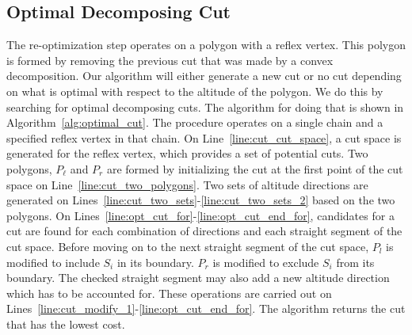 \documentclass[../main.tex]{subfiles}
\begin{document}
\subsection{Optimal Decomposing Cut}
\label{sec:alt_cut_decomposition}
The re-optimization step operates on a polygon with a reflex vertex. This polygon is formed by removing the previous cut that was made by a convex decomposition. Our algorithm will either generate a new cut or no cut depending on what is optimal with respect to the altitude of the polygon. We do this by searching for optimal decomposing cuts. The algorithm for doing that is shown in Algorithm~\ref{alg:optimal_cut}. The procedure operates on a single chain and a specified reflex vertex in that chain. On Line~\ref{line:cut_cut_space}, a cut space is generated for the reflex vertex, which provides a set of potential cuts. Two polygons, $P_{\ell}$ and $P_r$ are formed by initializing the cut at the first point of the cut space on Line~\ref{line:cut_two_polygons}. Two sets of altitude directions are generated on Lines~\ref{line:cut_two_sets}-\ref{line:cut_two_sets_2} based on the two polygons. On Lines~\ref{line:opt_cut_for}-\ref{line:opt_cut_end_for}, candidates for a cut are found for each combination of directions and each straight segment of the cut space. Before moving on to the next straight segment of the cut space, $P_l$ is modified to include $S_i$ in its boundary. $P_r$ is modified to exclude $S_i$ from its boundary. The checked straight segment may also add a new altitude direction which has to be accounted for. These operations are carried out on Lines~\ref{line:cut_modify_1}-\ref{line:opt_cut_end_for}. The algorithm returns the cut that has the lowest cost.
\end{document}
